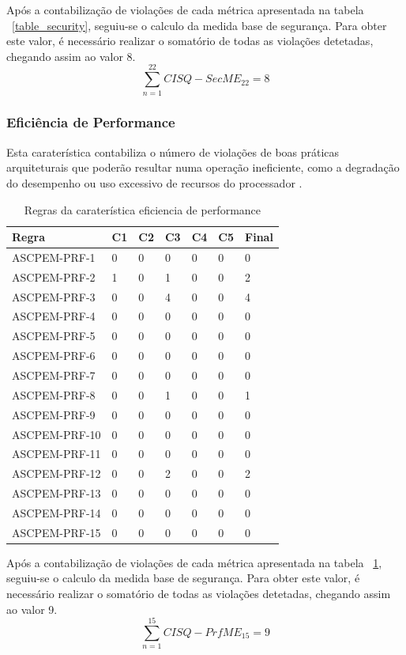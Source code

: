 \documentclass[openany,10pt,a4paper]{article}
\begin{document}
Após a contabilização de violações de cada métrica apresentada na tabela ~\ref{table_security}, seguiu-se o calculo da medida base de segurança. Para obter este valor, é necessário realizar o somatório de todas as violações detetadas, chegando assim ao valor 8.
$$\sum_{n=1}^{22} CISQ - SecME_{22} = 8$$

\subsubsection{Eficiência de Performance}
Esta caraterística contabiliza o número de violações de boas práticas arquiteturais que poderão resultar numa operação ineficiente, como a degradação do desempenho ou uso excessivo de recursos do processador \cite{OMG_Performance}.
\begin{longtable}{p{1.3in}|p{0.28in}|p{0.28in}|p{0.28in}|p{0.28in}|p{0.28in}|p{0.35in}}
	\caption{Regras da caraterística eficiencia de performance}
	\label{table_performance}
	\endhead
	\hline	
	\textbf{Regra} & \textbf{C1} & \textbf{C2} & \textbf{C3} & \textbf{C4} & \textbf{C5} & \textbf{Final} \\ \hline
ASCPEM-PRF-1 & 0 & 0 & 0 & 0 & 0 & 0 \\ \hline
ASCPEM-PRF-2 & 1 & 0 & 1 & 0 & 0 & 2 \\ \hline
ASCPEM-PRF-3 & 0 & 0 & 4 & 0 & 0 & 4 \\ \hline
ASCPEM-PRF-4 & 0 & 0 & 0 & 0 & 0 & 0 \\ \hline
ASCPEM-PRF-5 & 0 & 0 & 0 & 0 & 0 & 0 \\ \hline
ASCPEM-PRF-6 & 0 & 0 & 0 & 0 & 0 & 0 \\ \hline
ASCPEM-PRF-7 & 0 & 0 & 0 & 0 & 0 & 0 \\ \hline
ASCPEM-PRF-8 & 0 & 0 & 1 & 0 & 0 & 1 \\ \hline
ASCPEM-PRF-9 & 0 & 0 & 0 & 0 & 0 & 0 \\ \hline
ASCPEM-PRF-10 & 0 & 0 & 0 & 0 & 0 & 0 \\ \hline
ASCPEM-PRF-11 & 0 & 0 & 0 & 0 & 0 & 0 \\ \hline
ASCPEM-PRF-12 & 0 & 0 & 2 & 0 & 0 & 2 \\ \hline
ASCPEM-PRF-13 & 0 & 0 & 0 & 0 & 0 & 0 \\ \hline
ASCPEM-PRF-14 & 0 & 0 & 0 & 0 & 0 & 0 \\ \hline
ASCPEM-PRF-15 & 0 & 0 & 0 & 0 & 0 & 0 \\ \hline
	\end{longtable} 

Após a contabilização de violações de cada métrica apresentada na tabela ~\ref{table_performance}, seguiu-se o calculo da medida base de segurança. Para obter este valor, é necessário realizar o somatório de todas as violações detetadas, chegando assim ao valor 9.
$$\sum_{n=1}^{15} CISQ - PrfME_{15} = 9$$
\end{document}
